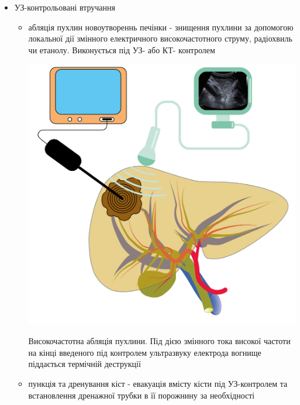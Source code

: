 \begin{itemize}
\begin{itemize}
    \end{itemize}
    \item УЗ-контрольовані втручання
    \begin{itemize}
        \item абляція пухлин новоутвореннь печінки - знищення пухлини за допомогою локальної дії змінного електричного високочастотного струму, радіохвиль чи етанолу. Виконується під УЗ- або КТ- контролем 
        \begin{marginfigure}%
            \includegraphics[width=\linewidth]{Figures/US procedures_Ablation.png}
            \caption{Високочастотна абляція пухлини. Під дією змінного тока високої частоти на кінці введеного під контролем ультразвуку електрода вогнище піддається термічній деструкції }
            \label{fig:goalbladder}
        \end{marginfigure}
        
        \item пункція та дренування кіст - евакуація вмісту кісти під УЗ-контролем та встановлення дренажної трубки в її порожнину за необхідності
        

\end{itemize}
\end{itemize}
